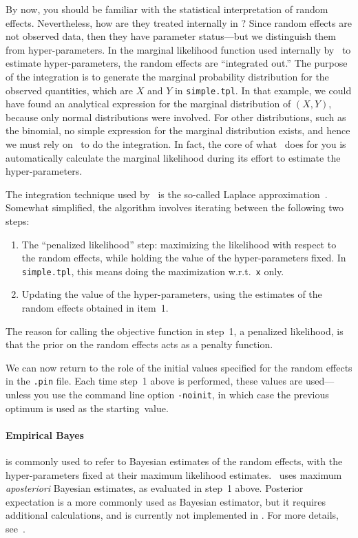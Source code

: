 \documentclass{admbmanual}
\newcommand{\citeasnoun}{\cite}
\begin{document}
By now, you should be familiar with the statistical interpretation of random
effects. Nevertheless, how are they treated internally in \scAR? Since random
effects are not observed data, then they have parameter status---but we
distinguish them from hyper-parameters. In the marginal likelihood function used
internally by \scAR\ to estimate hyper-parameters, the random effects are
``integrated out.'' The purpose of the integration is to generate the marginal
probability distribution for the observed quantities, which are $X$ and $Y$ in
\texttt{simple.tpl}. In that example, we could have found an analytical
expression for the marginal distribution of $(X,Y)$, because only normal
distributions were involved. For other distributions, such as the binomial, no
simple expression for the marginal distribution exists, and hence we must rely
on \scAB\ to do the integration. In fact, the core of what \scAR\ does for you
is automatically calculate the marginal likelihood during its effort to estimate
the hyper-parameters. 

The integration technique used by \scAR\ is the so-called Laplace
approximation~\cite{skaug_fournier1996aam}. Somewhat simplified, the algorithm
involves iterating between the following two steps:
\begin{enumerate}
  \item The ``penalized likelihood'' step: maximizing the likelihood with
  respect to the random effects, while holding the value of the hyper-parameters
  fixed. In \texttt{simple.tpl}, this means doing the maximization
  w.r.t.~\texttt{x} only.

  \item Updating the value of the hyper-parameters, using the estimates of the
  random effects obtained in item~1.
\end{enumerate}
The reason for calling the objective function in step~1, a penalized likelihood,
is that the prior on the random effects acts as a penalty function.

We can now return to the role of the initial values specified for the random
effects in the \texttt{.pin} file. Each time step~1 above is performed, these
values are used---unless you use the command line option \texttt{-noinit}, in
which case the previous optimum is used as the starting~value.

\paragraph{Empirical Bayes} is commonly used to refer to Bayesian estimates of
the random effects, with the hyper-parameters fixed at their maximum likelihood
estimates. \scAR\ uses maximum \textit{aposteriori} Bayesian estimates, as
evaluated in step~1 above. Posterior expectation is a more commonly used as
Bayesian estimator, but it requires additional calculations, and is currently
not implemented in \scAR. For more details,
see~\citeasnoun{skaug_fournier1996aam}.
\end{document}

